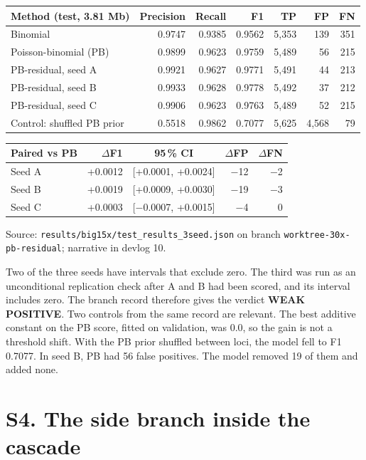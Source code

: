 \documentclass[11pt,a4paper]{article}
\newcommand{\src}[1]{{\small\texttt{#1}}}
\begin{document}
\begin{center}\small
\begin{tabular}{lrrrrrr}
\toprule
Method (test, 3.81 Mb) & Precision & Recall & F1 & TP & FP & FN \\
\midrule
Binomial & 0.9747 & 0.9385 & 0.9562 & 5,353 & 139 & 351 \\
Poisson-binomial (PB) & 0.9899 & 0.9623 & 0.9759 & 5,489 & 56 & 215 \\
PB-residual, seed A & 0.9921 & 0.9627 & 0.9771 & 5,491 & 44 & 213 \\
PB-residual, seed B & 0.9933 & 0.9628 & 0.9778 & 5,492 & 37 & 212 \\
PB-residual, seed C & 0.9906 & 0.9623 & 0.9763 & 5,489 & 52 & 215 \\
Control: shuffled PB prior & 0.5518 & 0.9862 & 0.7077 & 5,625 & 4,568 & 79 \\
\bottomrule
\end{tabular}

\vspace{0.6em}
\begin{tabular}{lrcrr}
\toprule
Paired vs PB & $\Delta$F1 & 95\,\% CI & $\Delta$FP & $\Delta$FN \\
\midrule
Seed A & +0.0012 & [+0.0001, +0.0024] & $-$12 & $-$2 \\
Seed B & +0.0019 & [+0.0009, +0.0030] & $-$19 & $-$3 \\
Seed C & +0.0003 & [$-$0.0007, +0.0015] & $-$4 & 0 \\
\bottomrule
\end{tabular}
\end{center}
{\small Source: \src{results/big15x/test\_results\_3seed.json} on branch
\src{worktree-30x-pb-residual}; narrative in devlog 10.}

Two of the three seeds have intervals that exclude zero. The third was run as an unconditional
replication check after A and B had been scored, and its interval includes zero. The branch
record therefore gives the verdict \textbf{WEAK POSITIVE}. Two controls from the same record
are relevant. The best additive constant on the PB score, fitted on validation, was 0.0, so the
gain is not a threshold shift. With the PB prior shuffled between loci, the model fell to
F1 0.7077. In seed B, PB had 56 false positives. The model removed 19 of them and added none.

\section{S4. The side branch inside the cascade}
\end{document}
